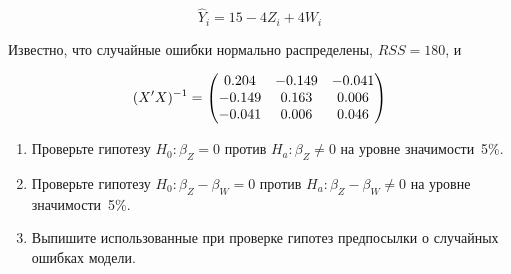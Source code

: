 \documentclass[12pt]{article}\usepackage[]{graphicx}\usepackage[svgnames]{xcolor}
\begin{document}
\begin{enumerate}
\[
\widehat{Y}_i=15-4Z_i+4W_i
\]

Известно, что случайные ошибки нормально распределены, $RSS=180$, и

\[
(X'X)^{-1} =
\ensuremath{%
\begin{pmatrix}{}
  0.204 & -0.149 & -0.041 \\ 
  -0.149 & 0.163 & 0.006 \\ 
  -0.041 & 0.006 & 0.046 \\ 
  \end{pmatrix}
}
\]


\begin{enumerate}
\item Проверьте гипотезу $H_0: \beta_Z = 0$ против $H_a: \beta_Z \neq 0$ на уровне значимости~5\%.
\item Проверьте гипотезу $H_0: \beta_Z - \beta_W = 0$  против $H_a: \beta_Z - \beta_W \neq 0$ на уровне значимости~5\%.
\item Выпишите использованные при проверке гипотез предпосылки о случайных ошибках модели.
\end{enumerate}


\end{enumerate}
\end{document}
